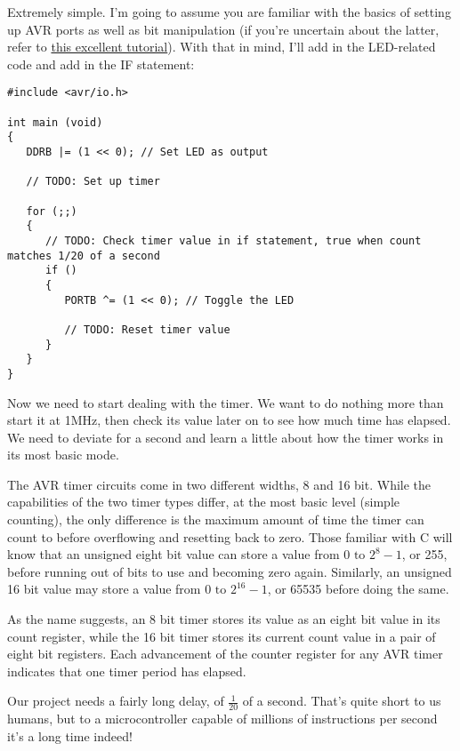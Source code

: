 \documentclass[a4paper,oneside,notitlepage]{book}
\begin{document}
Extremely simple. I'm going to assume you are familiar with the basics of setting up AVR ports as well as bit manipulation (if you're uncertain about the latter, refer to \href{http://www.avrfreaks.net/index.php?name=PNphpBB2&file=viewtopic&t=37871}{this excellent tutorial}). With that in mind, I'll add in the LED-related code and add in the IF statement: 

\begin{center}
\begin{lstlisting}
#include <avr/io.h>

int main (void)
{
   DDRB |= (1 << 0); // Set LED as output

   // TODO: Set up timer

   for (;;)
   {
      // TODO: Check timer value in if statement, true when count matches 1/20 of a second
      if ()
      {
         PORTB ^= (1 << 0); // Toggle the LED

         // TODO: Reset timer value
      }
   }
} 
\end{lstlisting}
\end{center}

Now we need to start dealing with the timer. We want to do nothing more than start it at 1MHz, then check its value later on to see how much time has elapsed. We need to deviate for a second and learn a little about how the timer works in its most basic mode.

The AVR timer circuits come in two different widths, 8 and 16 bit. While the capabilities of the two timer types differ, at the most basic level (simple counting), the only difference is the maximum amount of time the timer can count to before overflowing and resetting back to zero. Those familiar with C will know that an unsigned eight bit value can store a value from \(0 \text{ to } 2^{8}-1\), or 255, before running out of bits to use and becoming zero again. Similarly, an unsigned 16 bit value may store a value from \(0 \text{ to } 2^{16}-1\), or 65535 before doing the same.

As the name suggests, an 8 bit timer stores its value as an eight bit value in its count register, while the 16 bit timer stores its current count value in a pair of eight bit registers. Each advancement of the counter register for any AVR timer indicates that one timer period has elapsed.

Our project needs a fairly long delay, of \(\frac{1}{20}\) of a second. That's quite short to us humans, but to a microcontroller capable of millions of instructions per second it's a long time indeed!
\end{document}

